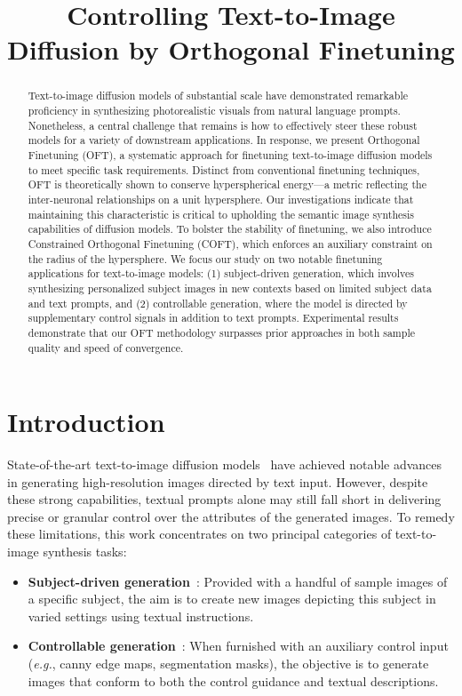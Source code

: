 \title{Controlling Text-to-Image Diffusion by Orthogonal Finetuning}

\begin{abstract}
Text-to-image diffusion models of substantial scale have demonstrated remarkable proficiency in synthesizing photorealistic visuals from natural language prompts. Nonetheless, a central challenge that remains is how to effectively steer these robust models for a variety of downstream applications. In response, we present Orthogonal Finetuning (OFT), a systematic approach for finetuning text-to-image diffusion models to meet specific task requirements. Distinct from conventional finetuning techniques, OFT is theoretically shown to conserve hyperspherical energy—a metric reflecting the inter-neuronal relationships on a unit hypersphere. Our investigations indicate that maintaining this characteristic is critical to upholding the semantic image synthesis capabilities of diffusion models. To bolster the stability of finetuning, we also introduce Constrained Orthogonal Finetuning (COFT), which enforces an auxiliary constraint on the radius of the hypersphere. We focus our study on two notable finetuning applications for text-to-image models: (1) subject-driven generation, which involves synthesizing personalized subject images in new contexts based on limited subject data and text prompts, and (2) controllable generation, where the model is directed by supplementary control signals in addition to text prompts. Experimental results demonstrate that our OFT methodology surpasses prior approaches in both sample quality and speed of convergence.
\end{abstract}

\section{Introduction}

State-of-the-art text-to-image diffusion models~\cite{saharia2022photorealistic,ramesh2022hierarchical,rombach2022high} have achieved notable advances in generating high-resolution images directed by text input. However, despite these strong capabilities, textual prompts alone may still fall short in delivering precise or granular control over the attributes of the generated images. To remedy these limitations, this work concentrates on two principal categories of text-to-image synthesis tasks:

\begin{itemize}[leftmargin=*,nosep]

    \item \textbf{Subject-driven generation}~\cite{ruiz2023dreambooth}: Provided with a handful of sample images of a specific subject, the aim is to create new images depicting this subject in varied settings using textual instructions.
    \item \textbf{Controllable generation}~\cite{zhang2023adding,mou2023t2i}: When furnished with an auxiliary control input (\emph{e.g.}, canny edge maps, segmentation masks), the objective is to generate images that conform to both the control guidance and textual descriptions.
\end{itemize}

